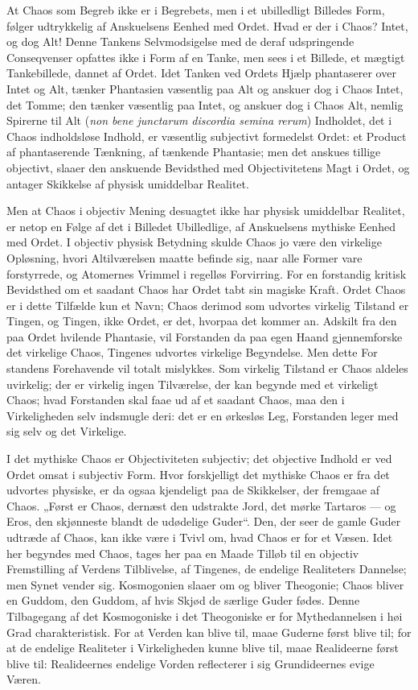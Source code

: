 \documentclass[12pt]{book}
\newcommand{\opage}[1]{\marginnote{\footnotesize\textit{[#1]}}}
\begin{document}
At Chaos som Begreb ikke er i Begrebets, men i et
ubilledligt Billedes Form, følger udtrykkelig af Anskuelsens
Eenhed med Ordet. Hvad er der i Chaos? Intet, og dog
Alt! Denne Tankens Selvmodsigelse med de deraf udspringende
Conseqvenser opfattes ikke i Form af en Tanke, men
sees i et Billede, et mægtigt Tankebillede, dannet af Ordet.
Idet Tanken ved Ordets Hjælp phantaserer over Intet og Alt,
tænker Phantasien væsentlig paa Alt og anskuer dog i Chaos
Intet, det Tomme; den tænker væsentlig paa Intet, og anskuer
dog i Chaos Alt, nemlig Spirerne til Alt (\textit{non bene junctarum
discordia semina rerum}) Indholdet, det i Chaos %
indholdsløse Indhold, er væsentlig subjectivt formedelst Ordet:
et Product af phantaserende Tænkning, af tænkende Phantasie;
men det anskues tillige objectivt, slaaer den anskuende Bevidsthed
med Objectivitetens Magt i Ordet, og antager Skikkelse
af physisk umiddelbar Realitet.

Men at Chaos i objectiv Mening desuagtet ikke har physisk
umiddelbar Realitet, er netop en Følge af det i Billedet Ubilledlige,
af Anskuelsens mythiske Eenhed med Ordet. I objectiv
physisk Betydning skulde Chaos jo være den virkelige Opløsning,
hvori Altilværelsen maatte befinde sig, naar alle Former
vare forstyrrede, og Atomernes Vrimmel i regelløs Forvirring.
For en forstandig kritisk Bevidsthed om et saadant Chaos har
Ordet tabt sin magiske Kraft. Ordet Chaos er i dette Tilfælde
kun et Navn; Chaos derimod som udvortes virkelig Tilstand er
Tingen, og Tingen, ikke Ordet, er det, hvorpaa det kommer
an. Adskilt fra den paa Ordet hvilende Phantasie, vil Forstanden
da paa egen Haand gjennemforske det virkelige Chaos,
Tingenes udvortes virkelige Begyndelse. Men dette For%
\opage{77}standens Forehavende vil totalt mislykkes. Som virkelig
Tilstand er Chaos aldeles uvirkelig; der er virkelig ingen Tilværelse,
der kan begynde med et virkeligt Chaos; hvad Forstanden
skal faae ud af et saadant Chaos, maa den i Virkeligheden
selv indsmugle deri: det er en ørkesløs Leg, Forstanden
leger med sig selv og det Virkelige.

I det mythiske Chaos er Objectiviteten subjectiv; det objective
Indhold er ved Ordet omsat i subjectiv Form. Hvor
forskjelligt det mythiske Chaos er fra det udvortes physiske, er
da ogsaa kjendeligt paa de Skikkelser, der fremgaae af Chaos.
„Først er Chaos, dernæst den udstrakte Jord, det mørke Tartaros
--- og Eros, den skjønneste blandt de udødelige Guder“.
Den, der seer de gamle Guder udtræde af Chaos, kan ikke
være i Tvivl om, hvad Chaos er for et Væsen. Idet her
begyndes med Chaos, tages her paa en Maade Tilløb til en
objectiv Fremstilling af Verdens Tilblivelse, af Tingenes, de
endelige Realiteters Dannelse; men Synet vender sig. Kosmogonien
slaaer om og bliver Theogonie; Chaos bliver en
Guddom, den Guddom, af hvis Skjød de særlige Guder
fødes. Denne Tilbagegang af det Kosmogoniske i det Theogoniske
er for Mythedannelsen i høi Grad charakteristisk. For
at Verden kan blive til, maae Guderne først blive til; for at
de endelige Realiteter i Virkeligheden kunne blive til, maae Realideerne
først blive til: Realideernes endelige Vorden reflecterer
i sig Grundideernes evige Væren.
\end{document}

